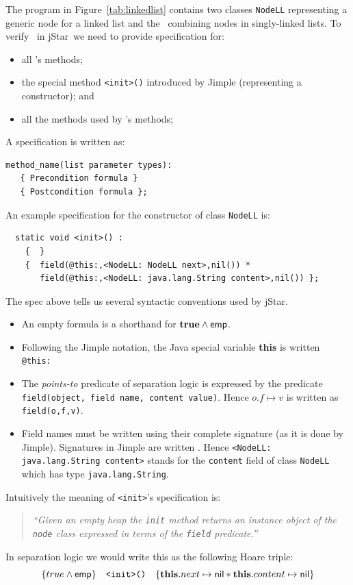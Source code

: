 \documentclass[11pt]{article}
\newcommand{\jStar}{{\sf jStar}}
\newcommand{\psto}{\mapsto}
\newcommand{\emp}{{\sf emp}}
\newcommand{\nil}{{\sf nil}}
\newcommand{\true}{\mathbf{true}}
\newcommand{\this}{\mathbf{this}}
\begin{document}
The program in Figure~\ref{tab:linkedlist} contains two classes
{\tt NodeLL}  representing a generic node for a linked list
and the \linkedlist \  combining nodes in 
singly-linked lists. To verify  \linkedlist \ in \jStar \ we
need to provide specification for:
\begin{itemize}
\item all
\linkedlist's methods;
\item the special method {\tt <init>()} introduced by Jimple
  (representing a constructor); and
\item  all the methods used by \linkedlist{}'s methods;
\end{itemize}
A specification is written as:
\begin{verbatim}
method_name(list parameter types): 
   { Precondition formula } 
   { Postcondition formula };
\end{verbatim}
An example specification for the constructor of class {\tt NodeLL} is:
\begin{verbatim}
  static void <init>() : 
    {  } 
    {  field(@this:,<NodeLL: NodeLL next>,nil()) * 
       field(@this:,<NodeLL: java.lang.String content>,nil()) };
\end{verbatim}
%
The spec above tells us several syntactic conventions used by \jStar.
\begin{itemize}
\item An empty formula is a shorthand for $\true \wedge \emp$.
\item Following the Jimple notation, the Java special variable {\bf
    this} is written {\tt @this:}
\item The {\em points-to} predicate of separation logic is expressed by the
  predicate {\tt field(object, field name, content value)}. Hence 
  $o.f\psto v$ is written as {\tt field(o,f,v)}.
\item Field names must be written using their complete signature (as
  it is done by Jimple). Signatures in Jimple are  written {\tt <ClassName: TypeOfField NameOfField>}.
  Hence {\tt <NodeLL: java.lang.String content>} stands for the {\tt content} field of class {\tt NodeLL} 
  which has type {\tt java.lang.String}.
\end{itemize}
Intuitively the meaning of {\tt <init>}'s specification is:
\begin{quote}
\it
 ``Given an
empty heap the {\tt init} method returns an instance object of the {\tt node}
class expressed in terms of the {\tt field} predicate.''
\end{quote}
In separation
logic we would write this as the following Hoare triple:
\[
\{ true \wedge \emp \} \quad \texttt{<init>()} \quad \{ \this.next \psto \nil * \this.content \psto \nil \}
\]
\end{document}
